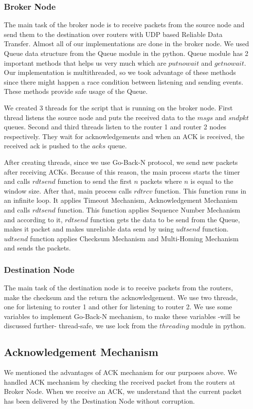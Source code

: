 \documentclass[conference]{IEEEtran}
\begin{document}
\subsubsection{Broker Node}
The main task of the broker node is to receive packets from the source node and send them to the destination over routers with UDP based Reliable Data Transfer. Almost all of our implementations are done in the broker node. We used Queue data structure from the Queue module in the python. Queue module has 2 important methods that helps us very much which are $putnowait$ and $getnowait$. Our implementation is multithreaded, so we took advantage of these methods since there might happen a race condition between listening and sending events. These methods provide safe usage of the Queue.
\par We created 3 threads for the script that is running on the broker node. First thread listens the source node and puts the received data to the $msgs$ and $sndpkt$ queues. Second and third threads listen to the router 1 and router 2 nodes respectively. They wait for acknowledgements and when an ACK is received, the received ack is pushed to the $acks$ queue.
\par After creating threads, since we use Go-Back-N protocol, we send new packets after receiving ACKs. Because of this reason, the main process starts the timer and calls $rdtsend$ function to send the first $n$ packets where $n$ is equal to the window size. After that, main process calls $rdtrcv$ function. This function runs in an infinite loop. It applies Timeout Mechanism, Acknowledgement Mechanism and calls $rdtsend$ function. This function applies Sequence Number Mechanism and according to it, $rdtsend$ function gets the data to be send from the Queue, makes it packet and makes unreliable data send by using $udtsend$ function. $udtsend$ function applies Checksum Mechanism and Multi-Homing Mechanism and sends the packets.
\subsubsection{Destination Node}
The main task of the destination node is to receive packets from the routers, make the checksum and the return the acknowledgement. We use two threads, one for listening to router 1 and other for listening to router 2. We use some variables to implement Go-Back-N mechanism, to make these variables -will be discussed further- thread-safe, we use lock from the $threading$ module in python.
\subsection{Acknowledgement Mechanism}
We mentioned the advantages of ACK mechanism for our purposes above. We handled ACK mechanism by checking the received packet from the routers at Broker Node. When we receive an ACK, we understand that the current packet has been delivered by the Destination Node without corruption.
\end{document}
